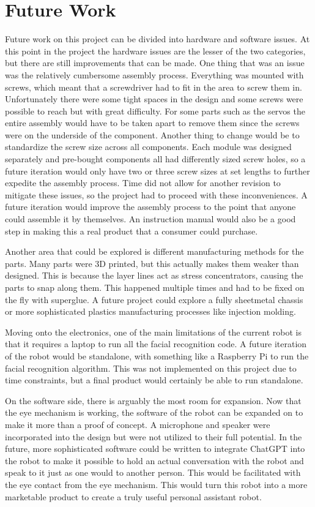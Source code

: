 \section{Future Work}
Future work on this project can be divided into hardware and software issues. At this point in the project the hardware issues are the lesser of the two categories, but there are still improvements that can be made. One thing that was an issue was the relatively cumbersome assembly process. Everything was mounted with screws, which meant that a screwdriver had to fit in the area to screw them in. Unfortunately there were some tight spaces in the design and some screws were possible to reach but with great difficulty. For some parts such as the servos the entire assembly would have to be taken apart to remove them since the screws were on the underside of the component. Another thing to change would be to standardize the screw size across all components. Each module was designed separately and pre-bought components all had differently sized screw holes, so a future iteration would only have two or three screw sizes at set lengths to further expedite the assembly process. Time did not allow for another revision to mitigate these issues, so the project had to proceed with these inconveniences. A future iteration would improve the assembly process to the point that anyone could assemble it by themselves. An instruction manual would also be a good step in making this a real product that a consumer could purchase.

Another area that could be explored is different manufacturing methods for the parts. Many parts were 3D printed, but this actually makes them weaker than designed. This is because the layer lines act as stress concentrators, causing the parts to snap along them. This happened multiple times and had to be fixed on the fly with superglue. A future project could explore a fully sheetmetal chassis or more sophisticated plastics manufacturing processes like injection molding.

Moving onto the electronics, one of the main limitations of the current robot is that it requires a laptop to run all the facial recognition code. A future iteration of the robot would be standalone, with something like a Raspberry Pi to run the facial recognition algorithm. This was not implemented on this project due to time constraints, but a final product would certainly be able to run standalone.

On the software side, there is arguably the most room for expansion. Now that the eye mechanism is working, the software of the robot can be expanded on to make it more than a proof of concept. A microphone and speaker were incorporated into the design but were not utilized to their full potential. In the future, more sophisticated software could be written to integrate ChatGPT into the robot to make it possible to hold an actual conversation with the robot and speak to it just as one would to another person. This would be facilitated with the eye contact from the eye mechanism. This would turn this robot into a more marketable product to create a truly useful personal assistant robot.